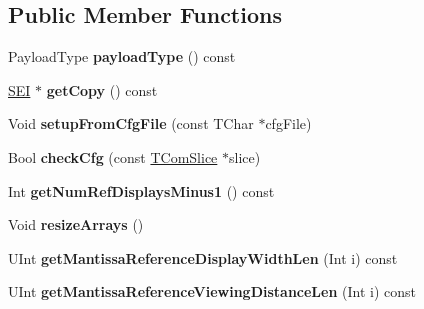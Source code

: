\subsection*{Public Member Functions}
\begin{DoxyCompactItemize}
\item 
\mbox{\label{class_s_e_i_three_dimensional_reference_displays_info_ae82735168f80950eb3644d128d79634a}} 
Payload\+Type {\bfseries payload\+Type} () const
\item 
\mbox{\label{class_s_e_i_three_dimensional_reference_displays_info_abc7bc7d1e2eb208726f6dfc1d03f4963}} 
\hyperlink{class_s_e_i}{S\+EI} $\ast$ {\bfseries get\+Copy} () const
\item 
\mbox{\label{class_s_e_i_three_dimensional_reference_displays_info_af21c0fee78296cf11f008cb01d8ce889}} 
Void {\bfseries setup\+From\+Cfg\+File} (const T\+Char $\ast$cfg\+File)
\item 
\mbox{\label{class_s_e_i_three_dimensional_reference_displays_info_ab421d64b5662bb4f2ee5024bd18ecefd}} 
Bool {\bfseries check\+Cfg} (const \hyperlink{class_t_com_slice}{T\+Com\+Slice} $\ast$slice)
\item 
\mbox{\label{class_s_e_i_three_dimensional_reference_displays_info_a60323fa5f707f83b63e022fca74cf0b5}} 
Int {\bfseries get\+Num\+Ref\+Displays\+Minus1} () const
\item 
\mbox{\label{class_s_e_i_three_dimensional_reference_displays_info_a2cb8e84402baeac94b3a2f1466d1c17b}} 
Void {\bfseries resize\+Arrays} ()
\item 
\mbox{\label{class_s_e_i_three_dimensional_reference_displays_info_afbce831237e533c8ddef33a04aaa535f}} 
U\+Int {\bfseries get\+Mantissa\+Reference\+Display\+Width\+Len} (Int i) const
\item 
\mbox{\label{class_s_e_i_three_dimensional_reference_displays_info_aca332aa960b6e67841d16673c8940fb2}} 
U\+Int {\bfseries get\+Mantissa\+Reference\+Viewing\+Distance\+Len} (Int i) const
\end{DoxyCompactItemize}
